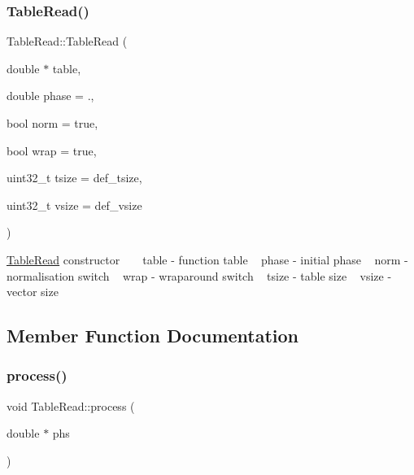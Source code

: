 \subsubsection{\texorpdfstring{Table\+Read()}{TableRead()}}
{\footnotesize\ttfamily Table\+Read\+::\+Table\+Read (\begin{DoxyParamCaption}\item[{double $\ast$}]{table,  }\item[{double}]{phase = {.},  }\item[{bool}]{norm = {\ttfamily true},  }\item[{bool}]{wrap = {\ttfamily true},  }\item[{uint32\+\_\+t}]{tsize = {\ttfamily def\+\_\+tsize},  }\item[{uint32\+\_\+t}]{vsize = {\ttfamily def\+\_\+vsize} }\end{DoxyParamCaption})\hspace{0.3cm}{\ttfamily [inline]}}

\hyperlink{class_table_read}{Table\+Read} constructor ~\newline
~\newline
table -\/ function table ~\newline
phase -\/ initial phase ~\newline
norm -\/ normalisation switch ~\newline
wrap -\/ wraparound switch ~\newline
tsize -\/ table size ~\newline
vsize -\/ vector size ~\newline


\subsection{Member Function Documentation}
\mbox{\label{class_table_read_ada219536a398309150f5f1270ac9534e}} 
\subsubsection{\texorpdfstring{process()}{process()}}
{\footnotesize\ttfamily void Table\+Read\+::process (\begin{DoxyParamCaption}\item[{double $\ast$}]{phs }\end{DoxyParamCaption})\hspace{0.3cm}{\ttfamily [virtual]}}

